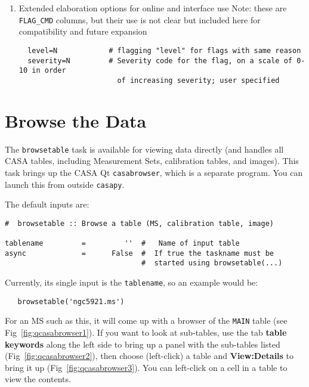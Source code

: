 \begin{enumerate}
\item Extended elaboration options for online and interface use Note:
these are {\tt FLAG\_CMD} columns, but their use is not clear but included
here for compatibility and future expansion

\small
\begin{verbatim}
  level=N            # flagging "level" for flags with same reason
  severity=N         # Severity code for the flag, on a scale of 0-10 in order 
                       of increasing severity; user specified
\end{verbatim}
\normalsize

\end{enumerate}

\section{Browse the Data}
\label{section:edit.browse}

The {\tt browsetable} task is available for viewing data directly
(and handles all CASA tables, including Measurement Sets, calibration tables,
and images). This task brings up the CASA Qt
{\tt casabrowser}, which is a separate program.  You can launch this
from outside {\tt casapy}.  

The default inputs are:
\small
\begin{verbatim}
#  browsetable :: Browse a table (MS, calibration table, image)

tablename         =         ''  #   Name of input table
async             =      False  #  If true the taskname must be
                                #  started using browsetable(...)

\end{verbatim}
\normalsize

Currently, its single input is the {\tt tablename}, so an example would
be:
\small
\begin{verbatim}
   browsetable('ngc5921.ms')
\end{verbatim}
\normalsize
For an MS such as this, it will come up with a browser of the 
{\tt MAIN} table (see Fig~\ref{fig:qcasabrowser1}).  
If you want to look at sub-tables, use the tab 
{\bf table keywords} along the left side to bring up a panel with the sub-tables
listed (Fig~\ref{fig:qcasabrowser2}), then choose (left-click) a table and
{\bf View:Details} to bring it up (Fig~\ref{fig:qcasabrowser3}).  
You can left-click on a cell in a table to view the
contents.

